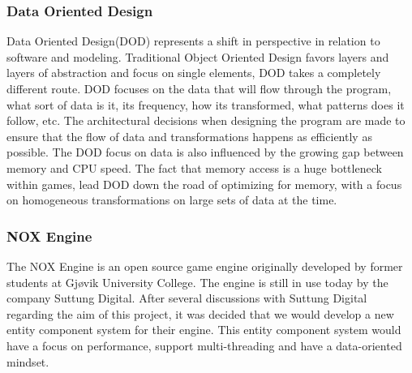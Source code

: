 \subsubsection{Data Oriented Design}
Data Oriented Design(DOD) represents a shift in perspective in relation to software and modeling. 
Traditional Object Oriented Design favors layers and layers of abstraction and focus on single elements, 
DOD takes a completely different route. 
DOD focuses on the data that will flow through the program, what sort of data is it, 
its frequency, how its transformed, what patterns does it follow, etc. 
The architectural decisions when designing the program are made to ensure that the flow of data
 and transformations happens as efficiently as possible.
\cite{noel_dod_shoot_in_foot, dod_com} 
The DOD focus on data is also influenced by the growing gap between memory and CPU speed. 
The fact that memory access is a huge bottleneck within games, lead DOD down the road of optimizing for memory, 
with a focus on homogeneous transformations on large sets of data at the time.
\cite{pitfalls_of_oop}

\subsubsection{NOX Engine}
The NOX Engine is an open source game engine originally developed by former students at Gj{\o}vik University College.
The engine is still in use today by the company Suttung Digital. 
After several discussions with Suttung Digital regarding the aim of this project, 
it was decided that we would develop a new entity component system for their engine. 
This entity component system would have a focus on performance, 
support multi-threading and have a data-oriented mindset.